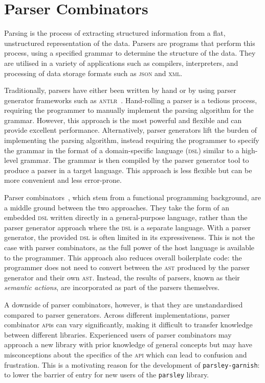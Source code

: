 \documentclass[../../main.tex]{subfiles}
\begin{document}
\section{Parser Combinators}\label{sec:background-parsers}

Parsing is the process of extracting structured information from a flat, unstructured representation of the data.
Parsers are programs that perform this process, using a specified grammar to determine the structure of the data.
They are utilised in a variety of applications such as compilers, interpreters, and processing of data storage formats such as \textsc{json} and \textsc{xml}.

Traditionally, parsers have either been written by hand or by using parser generator frameworks such as \textsc{antlr}~\cite{parr_antlr_2013}.
Hand-rolling a parser is a tedious process, requiring the programmer to manually implement the parsing algorithm for the grammar.
However, this approach is the most powerful and flexible and can provide excellent performance.
Alternatively, parser generators lift the burden of implementing the parsing algorithm, instead requiring the programmer to specify the grammar in the format of a domain-specific language (\textsc{dsl}) similar to a high-level grammar.
The grammar is then compiled by the parser generator tool to produce a parser in a target language.
This approach is less flexible but can be more convenient and less error-prone.

Parser combinators~\cite{hutton_higher-order_1992}, which stem from a functional programming background, are a middle ground between the two approaches.
They take the form of an embedded \textsc{dsl} written directly in a general-purpose language, rather than the parser generator approach where the \textsc{dsl} is a separate language.
With a parser generator, the provided \textsc{dsl} is often limited in its expressiveness.
This is not the case with parser combinators, as the full power of the host language is available to the programmer.
This approach also reduces overall boilerplate code: the programmer does not need to convert between the \textsc{ast} produced by the parser generator and their own \textsc{ast}.
Instead, the results of parsers, known as their \emph{semantic actions}, are incorporated as part of the parsers themselves.

A downside of parser combinators, however, is that they are unstandardised compared to parser generators.
Across different implementations, parser combinator \textsc{api}s can vary significantly, making it difficult to transfer knowledge between different libraries.
Experienced users of parser combinators may approach a new library with prior knowledge of general concepts but may have misconceptions about the specifics of the \textsc{api} which can lead to confusion and frustration.
This is a motivating reason for the development of \texttt{parsley-garnish}: to lower the barrier of entry for new users of the \texttt{parsley} library.
\end{document}
